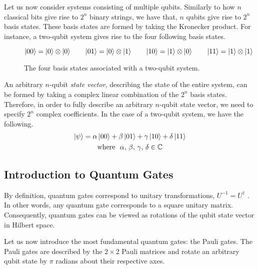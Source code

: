 Let us now consider systems consisting of multiple qubits. Similarly to how $n$ classical bits give rise to $2^n$ binary strings, we have that, $n$ qubits give rise to $2^n$ basis states. These basis states are formed by taking the Kronecker product. For instance, a two-qubit system gives rise to the four following basis states.

\begin{figure}[H]
    \centering
    \begin{equation*}
        \ket{00} = \ket 0 \otimes \ket 0 \qquad
        \ket{01} = \ket 0 \otimes \ket 1 \qquad
        \ket{10} = \ket 1 \otimes \ket 0 \qquad
        \ket{11} = \ket 1 \otimes \ket 1
    \end{equation*}
    \caption{The four basis states associated with a two-qubit system.}
    \label{two-qubit-states}
\end{figure}

An arbitrary $n$-qubit \textit{state vector}, describing the state of the entire system, can be formed by taking a complex linear combination of the $2^n$ basis states. Therefore, in order to fully describe an arbitrary $n$-qubit state vector, we need to specify $2^n$ complex coefficients. In the case of a two-qubit system, we have the following.
\begin{gather*}
    \ket\psi =
    \alpha \ket{00} +
    \beta \ket{01} +
    \gamma \ket{10} +
    \delta \ket{11} \\
    \text{where} \,\,\,\, \alpha, \, \beta, \, \gamma, \, \delta \in \mathbb{C}
\end{gather*}

\newpage
\subsection{Introduction to Quantum Gates}%
\label{quantum-gates}

By definition, quantum gates correspond to unitary transformations, $U^{-1} = U^\dagger$ \cite{Nielsen2012}. In other words, any quantum gate corresponds to a square unitary matrix. Consequently, quantum gates can be viewed as rotations of the qubit state vector in Hilbert space.

Let us now introduce the most fundamental quantum gates: the Pauli gates. The Pauli gates are described by the $2 \times 2$ Pauli matrices and rotate an arbitrary qubit state by $\pi$ radians about their respective axes.

